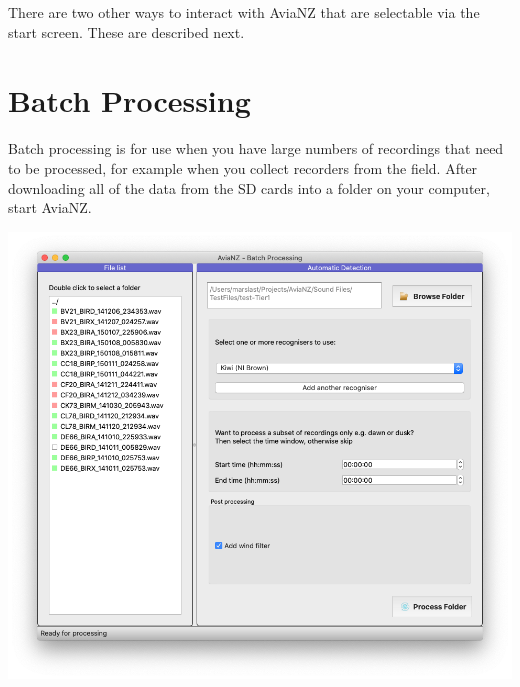 \documentclass{article}
\begin{document}
There are two other ways to interact with AviaNZ that are selectable via the start screen. These are described next. 

\newpage
\section{Batch Processing}
\label{sec:auto}

Batch processing is for use when you have large numbers of recordings that need to be processed, for example when you collect recorders from the field. After downloading all of the data from the SD cards into a folder on your computer, start AviaNZ. 

\begin{center}
\includegraphics[width=.5\textwidth]{Figures/BatchProcessing}
\end{center}
\end{document}
